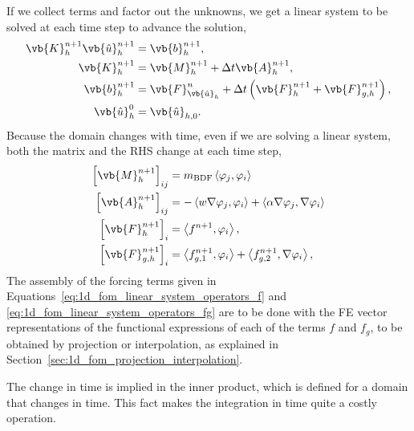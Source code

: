 \documentclass[../../main.tex]{subfiles}
\newcommand{\inner}[2]{\left<#1, #2\right>}
\begin{document}
If we collect terms and factor out the unknowns, we get a linear system to be solved at each time step to advance the solution,
\begin{subequations}
    \begin{align}
        \label{eq:1d_fom_linear_system_timestep}
        \vb{K}_h^{n+1} \vb{\hat{u}}_h^{n+1} &= \vb{b}_h^{n+1}, \\
        \vb{K}_h^{n+1} &= \vb{M}_{h}^{n+1} + \Delta t \vb{A}_{h}^{n+1}, \\
        \vb{b}_h^{n+1} &= \vb{F}_{\vb{\hat{u}}_h}^{n} + \Delta t \left(\vb{F}_h^{n+1} + \vb{F}_{g,h}^{n+1}\right), \\
        \vb{\hat{u}}_h^{0} &= \vb{\hat{u}}_{h,0}.
    \end{align}
\end{subequations}
Because the domain changes with time, even if we are solving a linear system, both the matrix and the RHS change at each time step,
\begin{subequations}
    \label{eq:1d_fom_linear_system_operators}
    \begin{align}
        \left[\vb{M}_{h}^{n+1}\right]_{ij} &= m_{\text{BDF}} \inner{\varphi_j}{\varphi_i}  \\
        \left[\vb{A}_{h}^{n+1}\right]_{ij} &= -\inner{w \grad \varphi_j}{\varphi_i} + \inner{\alpha \grad \varphi_j}{\grad \varphi_i} \\
        \left[\vb{F}_{h}^{n+1}\right]_{i} &= \inner{f^{n+1}}{\varphi_i}, \label{eq:1d_fom_linear_system_operators_f} \\
        \left[\vb{F}_{{g,h}}^{n+1}\right]_{i} &= \inner{f_{g,1}^{n+1}}{\varphi_i} + \inner{f_{g,2}^{n+1}}{\grad \varphi_i}, \label{eq:1d_fom_linear_system_operators_fg}
    \end{align}
\end{subequations}
The assembly of the forcing terms given in Equations~\eqref{eq:1d_fom_linear_system_operators_f} and \eqref{eq:1d_fom_linear_system_operators_fg}
are to be done with the FE vector representations of the functional expressions of each of the terms $f$ and $f_g$, to be obtained by projection or interpolation, as explained in Section~\ref{sec:1d_fom_projection_interpolation}.

The change in time is implied in the inner product, which is defined for a domain that changes in time. 
This fact makes the integration in time quite a costly operation.
\end{document}
